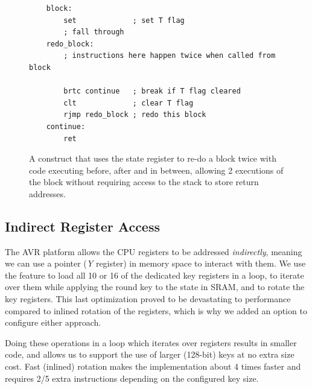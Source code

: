 \documentclass[11pt]{llncs2e} %
\begin{document}
\begin{figure}[H]
\centering
	\begin{lstlisting}
	block:
		set             ; set T flag
		; fall through
	redo_block:
		; instructions here happen twice when called from block

		brtc continue   ; break if T flag cleared
		clt             ; clear T flag
		rjmp redo_block ; redo this block
	continue:
		ret
	\end{lstlisting}
	\caption{\footnotesize A construct that uses the state register to re-do a block twice with code executing before, after and in between, allowing 2 executions of the block without requiring access to the stack to store return addresses.}
\label{sreg_redo}
\end{figure}




\subsection{Indirect Register Access}
\label{indirect}
The AVR platform allows the CPU registers to be addressed \textit{indirectly}, meaning we can use a pointer (\textit{Y} register) in memory space to interact with them.
We use the feature to load all 10 or 16 of the dedicated key registers in a loop, to iterate over them while applying the round key to the state in SRAM, and to rotate the key registers.
This last optimization proved to be devastating to performance compared to inlined rotation of the registers, which is why we added an option to configure either approach.

Doing these operations in a loop which iterates over registers results in smaller code, and allows us to support the use of larger (128-bit) keys at no extra size cost.
Fast (inlined) rotation makes the implementation about 4 times faster and requires 2/5 extra instructions depending on the configured key size.
\end{document}
